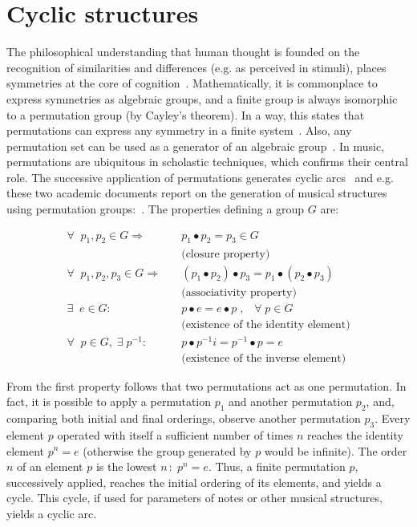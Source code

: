 \documentclass[format=acmsmall, review=false, screen=true]{acmart}
\begin{document}
\section{Cyclic structures}\label{estCic}
The philosophical understanding that human thought is founded on the recognition of similarities and differences (e.g. as perceived in stimuli), places symmetries
at the core of cognition~\cite{Deleuze}.
Mathematically, it is commonplace to express symmetries as algebraic groups, and a finite group is always isomorphic to a permutation
group (by Cayley's theorem).
In a way, this states that permutations can express any symmetry in a
finite system~\cite{gruposFascination}.
Also, any permutation set can be used as a generator of an algebraic group~\cite{permMusic}.
In music, permutations are ubiquitous in scholastic techniques,
 which confirms their central role.
The successive application of permutations generates cyclic arcs~\cite{change,Zamacois,permMusic} and
e.g. these two academic documents report on the generation of musical structures using permutation groups:~\cite{figgusOriginal, figgusEspacializacao}.
The properties defining a group $G$ are:

\begin{equation}\label{eq:groups}
\begin{split}
\forall \;\; p_1,p_2 \in G \Rightarrow  \quad   & p_1 \bullet p_2  = p_3 \in G \\ 
     & \text{(closure property)} \\
\forall \;\; p_1,p_2,p_3 \in G \Rightarrow \quad & (p_1\bullet p_2)\bullet p_3  = p_1\bullet (p_2\bullet p_3) \\
     & \text{(associativity property)} \\
\exists \;\; e \in G :                  \quad    & p \bullet e  = e \bullet p \;,\;\;\; \forall\; p \in G  \\ 
     &  \text{(existence of the identity element)} \\
\forall \;\; p \in G, \;\exists\; p^{-1} :\quad  &  p\bullet p^{-1}i =p^{-1}\bullet p = e \\
     &  \text{(existence of the inverse element)}
\end{split}
\end{equation}

From the first property follows that two permutations act as one permutation. In fact, it is possible to apply a
permutation $p_1$ and another permutation $p_2$, and, comparing both initial and final orderings, observe another permutation $p_3$.
Every element $p$ operated with itself a sufficient number of times $n$ reaches the identity element $p^n=e$ (otherwise the group generated by $p$ would be infinite).
The order $n$ of an element $p$ is
the lowest $n\,:\;p^n=e$.
Thus, a finite
permutation $p$, successively applied, reaches the initial ordering of its
elements, and yields a cycle. This cycle, if used for parameters of notes or other musical structures,
yields a cyclic arc.
\end{document}

